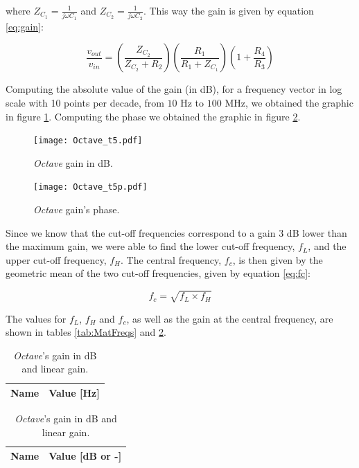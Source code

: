 where $Z_{C_1}=\frac{1}{j \omega C_1}$ and $Z_{C_2}=\frac{1}{j \omega C_2}$. This way the gain is given by equation \ref{eq:gain}:

\begin{equation}
  \frac{v_{out}}{v_{in}}=(\frac{Z_{C_2}}{Z_{C_2}+R_2})(\frac{R_1}{R_1+Z_{C_1}})(1+\frac{R_4}{R_3})
  \label{eq:gain}
\end{equation} 

Computing the absolute value of the gain (in dB), for a frequency vector in log scale with 10 points per decade,
from $10$ Hz to $100$ MHz, we obtained the graphic in figure \ref{fig:MatGain_dB}. Computing the phase we obtained the graphic in figure \ref{fig:MatPhase}. 

\clearpage

\vspace{-0.25cm}
\begin{figure}[h] \centering
  \texttt{[image: Octave\_t5.pdf]}
  \caption{\emph{Octave} gain in dB.}
  \label{fig:MatGain_dB}
\end{figure}

\begin{figure}[h] \centering
    \texttt{[image: Octave\_t5p.pdf]}
    \caption{\emph{Octave} gain's phase.}
    \label{fig:MatPhase}
\end{figure}

\clearpage

Since we know that the cut-off frequencies correspond to a gain $3$ dB lower than the maximum gain, we were able to find the lower cut-off frequency, $f_L$, 
and the upper cut-off frequency, $f_H$. The central frequency, $f_c$, 
is then given by the geometric mean of the two cut-off frequencies, given by equation \ref{eq:fc}:

\begin{equation}
  f_c = \sqrt{f_L \times f_H}
\label{eq:fc}
\end{equation}

The values for $f_L$, $f_H$ and $f_c$, as well as the gain at the central frequency, are shown in tables \ref{tab:MatFreqs} and \ref{tab:MatGain}.

\begin{table}[h]
    \parbox{.45\linewidth}{
      \centering
      \begin{tabular}{|c|c|}
        \hline
        {\bf Name} & {\bf Value [Hz]} \\ \hline
        
      \end{tabular}
      \caption{\emph{Octave}'s cut-off frequencies and central frequency.}\label{tab:MatFreqs}
    }
    \hfill
    \parbox{.45\linewidth}{
      \centering
      \begin{tabular}{|c|c|}
        \hline
        {\bf Name} & {\bf Value [dB or -]} \\ \hline
        
      \end{tabular}
      \caption{\emph{Octave}'s gain in dB and linear gain.}\label{tab:MatGain}
    }
\end{table}

